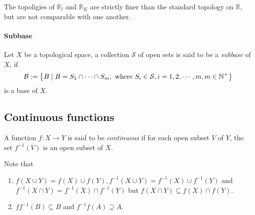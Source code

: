 \begin{proposition}
  The topoligies of \( \mathbb{R}_l \) and \( \mathbb{R}_K \) are strictly finer
  than the standard topology on \( \mathbb{R} \), but are not comparable with
  one another.
\end{proposition}

\paragraph{Subbase}

\begin{definition}
  Let \( X \) be a topological space, a collection \( \mathcal{S} \) of open sets is said to be a \emph{subbase} of \( X \), if
  \[
    \mathcal{B} := \left\lbrace B \mid B = S_1 \cap \cdots \cap S_m, \textmd{ where } S_i \in \mathcal{S}, i = 1, 2, \cdots, m, m \in \mathbb{N}^+ \right\rbrace
  \]
  is a base of \( X \).
\end{definition}

\subsection{Continuous functions}

\begin{definition}
  A function \( f: X \to Y \) is said to be \emph{continuous} if for each open subset \( V \) of \( Y \), the set \( f^{-1}(V) \) is an open subset of \( X \).
\end{definition}
\begin{remark}
  Note that
  \begin{enumerate}
    \item \( f(X \cup Y) = f(X) \cup f(Y), f^{-1}(X \cup Y) = f^{-1}(X) \cup f^{-1}(Y) \) and \( f^{-1}(X \cap Y) = f^{-1}(X) \cap f^{-1}(Y) \)  but \( f(X \cap Y) \subseteq f(X) \cap f(Y) \).
    \item \( ff^{-1}(B) \subseteq B \) and \( f^{-1}f(A) \supseteq A \).
  \end{enumerate}
\end{remark}

